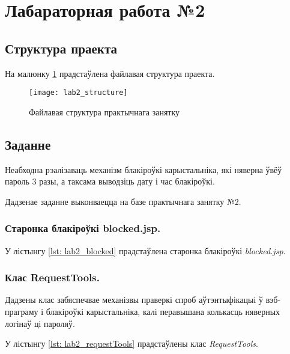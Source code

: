 \section{Лабараторная работа №2}

\subsection{Структура праекта}

На малюнку \ref{img: lab2} прадстаўлена файлавая структура праекта.

\begin{figure}[h!]
    \centering
    \texttt{[image: lab2\_structure]}
    \caption{Файлавая структура практычнага занятку}
    \label{img: lab2} 
\end{figure}

\subsection{Заданне}

Неабходна рэалізаваць механізм блакіроўкі карыстальніка, які
няверна ўвёў пароль 3 разы, а таксама выводзіць дату і час блакіроўкі.

Дадзенае заданне выконваецца на базе практычнага занятку №2.

\subsubsection{Старонка блакіроўкі blocked.jsp.}

У лістынгу \ref{lst: lab2_blocked} прадстаўлена старонка блакіроўкі
\textit{blocked.jsp}.



\subsubsection{Клас RequestTools.}

Дадзены клас забяспечвае механізвы праверкі спроб аўтэнтыфікацыі
ў вэб-праграму і блакіроўкі карыстальніка, калі перавышана колькасць
няверных логінаў ці пароляў.

У лістынгу \ref{lst: lab2_requestTools} прадстаўлены клас
\textit{RequestTools}.



